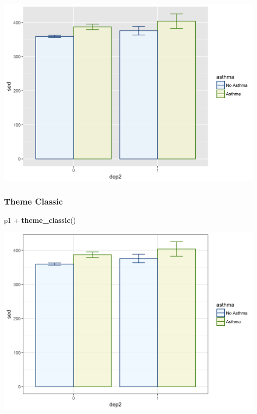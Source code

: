 \documentclass[]{tufte-book}
\newenvironment{Shaded}{}{}
\newcommand{\KeywordTok}[1]{\textcolor[rgb]{0.00,0.44,0.13}{\textbf{#1}}}
\newcommand{\StringTok}[1]{\textcolor[rgb]{0.25,0.44,0.63}{#1}}
\newcommand{\OperatorTok}[1]{\textcolor[rgb]{0.40,0.40,0.40}{#1}}
\newcommand{\NormalTok}[1]{#1}
\theoremstyle{definition}
\theoremstyle{definition}
\theoremstyle{remark}
\begin{document}
\includegraphics{_main_files/figure-latex/unnamed-chunk-145-1}

\subsubsection*{Theme Classic}\label{theme-classic}

\begin{Shaded}
\begin{Highlighting}[]
\NormalTok{p1 }\OperatorTok{+}\StringTok{ }\KeywordTok{theme_classic}\NormalTok{()}
\end{Highlighting}
\end{Shaded}

\includegraphics{_main_files/figure-latex/unnamed-chunk-146-1}
\end{document}
